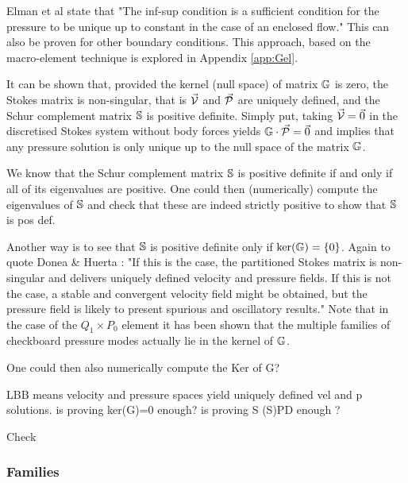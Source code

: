 Elman et al \cite{elsw} state that "The inf-sup condition is a sufficient condition for the pressure to be unique up
to  constant in the case of an enclosed flow." This can also be proven for other boundary conditions.
This approach, based on the macro-element technique \cite{sten90} is explored in Appendix \ref{app:Gel}.


It can be shown that, provided the kernel (null space) of matrix ${\mathbb{G}}$ is zero,
the Stokes matrix is non-singular, that is $\vec{\cal V}$ and $\vec{\cal P}$ 
are uniquely defined, and the Schur complement matrix ${\mathbb{S}}$ is positive definite. 
Simply put, taking $\vec{\cal V}=\vec{0}$ in the discretised Stokes system 
without body forces yields ${\mathbb{G}} \cdot \vec{\cal P}=\vec{0}$ and implies
that any pressure solution is only unique up to the null space of the matrix ${\mathbb{G}}$.

We know that the Schur complement matrix ${\mathbb{S}}$ is positive definite if and only if all of its eigenvalues are positive.
One could then (numerically) compute the eigenvalues of ${\mathbb{S}}$ and check that these are indeed strictly positive
to show that ${\mathbb{S}}$ is pos def. 


Another way is to see that ${\mathbb{S}}$ is positive definite only if $\text{ker}({\mathbb{G}})=\{0\}$.
Again to quote Donea \& Huerta \cite{dohu03}: "If this is the case, the partitioned Stokes matrix  
is non-singular and delivers uniquely defined velocity and pressure fields. If this is not the case, a
stable and convergent velocity field might be obtained, but the pressure field is likely
to present spurious and oscillatory results." 
Note that in the case of the $Q_1 \times P_0$ element it has been shown that the multiple families of 
checkboard pressure modes actually lie in the kernel of ${\mathbb{G}}$. \cite{sagl81a,sagl81b}

One could then also numerically compute the Ker of G?

\vspace{.4cm}

LBB means velocity and pressure spaces yield uniquely defined vel and p solutions. 
is proving ker(G)=0 enough? is proving S (S)PD enough ?

Check \cite{chba93}


\subsubsection{Families}

